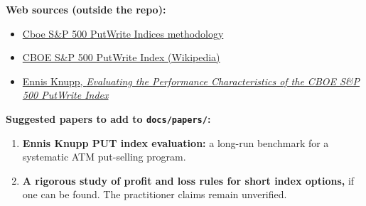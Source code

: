 \documentclass{article}
\begin{document}
\textbf{Web sources (outside the repo):}

\begin{itemize}

\item \href{https://cdn.cboe.com/api/global/us_indices/governance/Cboe_SP_500_PutWrite_Indices_Methodology.pdf}{Cboe S\&P 500 PutWrite Indices methodology}

\item \href{https://en.wikipedia.org/wiki/CBOE_S\&P_500_PutWrite_Index}{CBOE S\&P 500 PutWrite Index (Wikipedia)}

\item \href{https://cdn.cboe.com/resources/education/research_publications/PUTIndexEnnisKnupp.pdf}{Ennis Knupp, \emph{Evaluating the Performance Characteristics of the CBOE S\&P 500 PutWrite Index}}

\end{itemize}

\textbf{Suggested papers to add to \texttt{docs/\allowbreak{}papers/\allowbreak{}}:}

\begin{enumerate}

\item \textbf{Ennis Knupp PUT index evaluation:} a long-run benchmark for a systematic ATM put-selling program.

\item \textbf{A rigorous study of profit and loss rules for short index options,} if one can be found. The practitioner claims remain unverified.

\end{enumerate}
\end{document}

